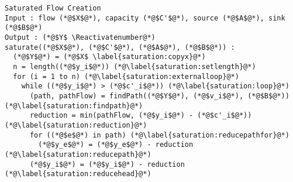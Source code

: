 {}
\Suppressnumber
\begin{lstlisting}[label=saturationcode, style=numbers]
Saturated Flow Creation
Input : flow (*@$X$@*), capacity (*@$C'$@*), source (*@$A$@*), sink (*@$B$@*)
Output : (*@$Y$ \Reactivatenumber@*)
saturate((*@$X$@*), (*@$C'$@*), (*@$A$@*), (*@$B$@*)) :
  (*@$Y$@*) = (*@$X$ \label{saturation:copyx}@*)
  n = length((*@$y_i$@*)) (*@\label{saturation:setlength}@*)
  for (i = 1 to n) (*@\label{saturation:externalloop}@*)
    while ((*@$y_i$@*) > (*@$c'_i$@*)) (*@\label{saturation:loop}@*)
      (path, pathFlow) = findPath((*@$Y$@*), (*@$v_i$@*), (*@$B$@*)) (*@\label{saturation:findpath}@*)
      reduction = min(pathFlow, (*@$y_i$@*) - (*@$c'_i$@*)) (*@\label{saturation:reduction}@*)
      for ((*@$e$@*) in path) (*@\label{saturation:reducepathfor}@*)
        (*@$y_e$@*) = (*@$y_e$@*) - reduction (*@\label{saturation:reducepath}@*)
      (*@$y_i$@*) = (*@$y_i$@*) - reduction (*@\label{saturation:reducehead}@*)
\end{lstlisting}
